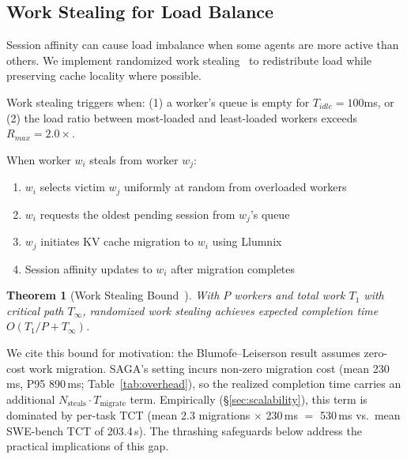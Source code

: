 \documentclass[sigconf]{acmart}
\newtheorem{theorem}{Theorem}
\begin{document}
\subsection{Work Stealing for Load Balance}
\label{sec:stealing}

Session affinity can cause load imbalance when some agents are more active than others. We implement randomized work stealing~\cite{blumofe1999scheduling} to redistribute load while preserving cache locality where possible.

Work stealing triggers when: (1) a worker's queue is empty for $T_{idle} = 100$ms, or (2) the load ratio between most-loaded and least-loaded workers exceeds $R_{max} = 2.0\times$.

When worker $w_i$ steals from worker $w_j$:
\begin{enumerate}[leftmargin=*,noitemsep]
    \item $w_i$ selects victim $w_j$ uniformly at random from overloaded workers
    \item $w_i$ requests the oldest pending session from $w_j$'s queue
    \item $w_j$ initiates KV cache migration to $w_i$ using Llumnix~\cite{sun2024llumnix}
    \item Session affinity updates to $w_i$ after migration completes
\end{enumerate}

\begin{theorem}[Work Stealing Bound~\cite{blumofe1999scheduling}]
With $P$ workers and total work $T_1$ with critical path $T_\infty$, randomized work stealing achieves expected completion time $O(T_1/P + T_\infty)$.
\end{theorem}

We cite this bound for motivation: the Blumofe--Leiserson result assumes zero-cost work migration. SAGA's setting incurs non-zero migration cost (mean 230\,ms, P95 890\,ms; Table~\ref{tab:overhead}), so the realized completion time carries an additional $N_\text{steals} \cdot T_\text{migrate}$ term. Empirically (\S\ref{sec:scalability}), this term is dominated by per-task TCT (mean 2.3 migrations $\times$ 230\,ms $=$ 530\,ms vs.\ mean SWE-bench TCT of 203.4\,s). The thrashing safeguards below address the practical implications of this gap.
\end{document}
